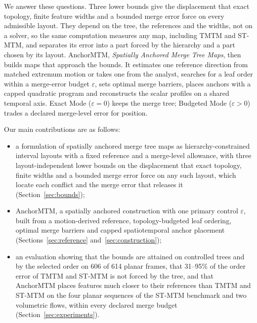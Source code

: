 \documentclass{vgtc}                %
\begin{document}
We answer these questions. Three lower bounds give the displacement that exact topology, finite feature widths and a bounded merge error force on every admissible layout. They depend on the tree, the references and the widths, not on a solver, so the same computation measures any map, including TMTM and ST-MTM, and separates its error into a part forced by the hierarchy and a part chosen by its layout. AnchorMTM, \emph{Spatially Anchored Merge Tree Maps}, then builds maps that approach the bounds. It estimates one reference direction from matched extremum motion or takes one from the analyst, searches for a leaf order within a merge-error budget $\varepsilon$, sets optimal merge barriers, places anchors with a capped quadratic program and reconstructs the scalar profiles on a shared temporal axis. Exact Mode ($\varepsilon=0$) keeps the merge tree; Budgeted Mode ($\varepsilon>0$) trades a declared merge-level error for position.

Our main contributions are as follows:
\begin{itemize}
\setlength{\itemsep}{2pt}
\setlength{\parsep}{0pt}
\item a formulation of spatially anchored merge tree maps as hierarchy-constrained interval layouts with a fixed reference and a merge-level allowance, with three layout-independent lower bounds on the displacement that exact topology, finite widths and a bounded merge error force on any such layout, which locate each conflict and the merge error that releases it (Section~\ref{sec:bounds});
\item AnchorMTM, a spatially anchored construction with one primary control $\varepsilon$, built from a motion-derived reference, topology-budgeted leaf ordering, optimal merge barriers and capped spatiotemporal anchor placement (Sections~\ref{sec:reference} and~\ref{sec:construction});
\item an evaluation showing that the bounds are attained on controlled trees and by the selected order on 606 of 614 planar frames, that 31--95\% of the order error of TMTM and ST-MTM is not forced by the tree, and that AnchorMTM places features much closer to their references than TMTM and ST-MTM on the four planar sequences of the ST-MTM benchmark and two volumetric flows, within every declared merge budget (Section~\ref{sec:experiments}).
\end{itemize}

\end{document}
